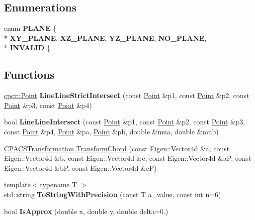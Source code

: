 \subsection*{Enumerations}
\begin{DoxyCompactItemize}
\item 
enum {\bfseries P\-L\-A\-N\-E} \{ \\*
{\bfseries X\-Y\-\_\-\-P\-L\-A\-N\-E}, 
{\bfseries X\-Z\-\_\-\-P\-L\-A\-N\-E}, 
{\bfseries Y\-Z\-\_\-\-P\-L\-A\-N\-E}, 
{\bfseries N\-O\-\_\-\-P\-L\-A\-N\-E}, 
\\*
{\bfseries I\-N\-V\-A\-L\-I\-D}
 \}
\end{DoxyCompactItemize}
\subsection*{Functions}
\begin{DoxyCompactItemize}
\item 
\hypertarget{namespacecpcr_a0825a4b414f89ce7e36a2ee8f7141ca6}{\hyperlink{classcpcr_1_1Point}{cpcr\-::\-Point} {\bfseries Line\-Line\-Strict\-Intersect} (const \hyperlink{classcpcr_1_1Point}{Point} \&p1, const \hyperlink{classcpcr_1_1Point}{Point} \&p2, const \hyperlink{classcpcr_1_1Point}{Point} \&p3, const \hyperlink{classcpcr_1_1Point}{Point} \&p4)}\label{namespacecpcr_a0825a4b414f89ce7e36a2ee8f7141ca6}

\item 
\hypertarget{namespacecpcr_abed52ba85eeeec539fa33028bd3740c6}{bool {\bfseries Line\-Line\-Intersect} (const \hyperlink{classcpcr_1_1Point}{Point} \&p1, const \hyperlink{classcpcr_1_1Point}{Point} \&p2, const \hyperlink{classcpcr_1_1Point}{Point} \&p3, const \hyperlink{classcpcr_1_1Point}{Point} \&p4, \hyperlink{classcpcr_1_1Point}{Point} \&pa, \hyperlink{classcpcr_1_1Point}{Point} \&pb, double \&mua, double \&mub)}\label{namespacecpcr_abed52ba85eeeec539fa33028bd3740c6}

\item 
\hyperlink{classcpcr_1_1CPACSTransformation}{C\-P\-A\-C\-S\-Transformation} \hyperlink{namespacecpcr_af0d181d51eb8844af908bd32826fbdb5}{Transform\-Chord} (const Eigen\-::\-Vector4d \&a, const Eigen\-::\-Vector4d \&b, const Eigen\-::\-Vector4d \&c, const Eigen\-::\-Vector4d \&a\-P, const Eigen\-::\-Vector4d \&b\-P, const Eigen\-::\-Vector4d \&c\-P)
\item 
\hypertarget{namespacecpcr_a59c946e6ef7e8e517d3e17852c27851e}{{\footnotesize template$<$typename T $>$ }\\std\-::string {\bfseries To\-String\-With\-Precision} (const T a\-\_\-value, const int n=6)}\label{namespacecpcr_a59c946e6ef7e8e517d3e17852c27851e}

\item 
\hypertarget{namespacecpcr_af660d73c6127f3e93babae77cb66f879}{bool {\bfseries Is\-Approx} (double x, double y, double delta=0.)}\label{namespacecpcr_af660d73c6127f3e93babae77cb66f879}

\end{DoxyCompactItemize}


